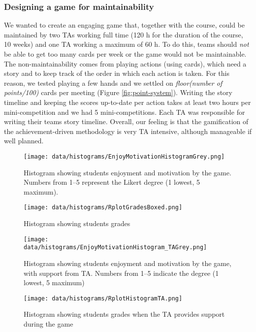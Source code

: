 \documentclass[sigconf]{acmart}
\begin{document}
\hypertarget{designing-a-game-for-maintainability}{%
\subsubsection*{Designing a game for
maintainability}\label{designing-a-game-for-maintainability}}

We wanted to create an engaging game that, together with the course,
could be maintained by two TAs working full time (120 h for the duration
of the course, 10 weeks) and one TA working a maximum of 60 h. To do
this, teams should \emph{not} be able to get too many cards per week or
the game would not be maintainable. The non-maintainability comes from
playing actions (using cards), which need a story and to keep track of
the order in which each action is taken. For this reason, we tested
playing a few hands and we settled on
\textit{floor(number of points/100)} cards per meeting (Figure
\ref{fig:point-system}). Writing the story timeline and keeping the
scores up-to-date per action takes at least two hours per
mini-competition and we had 5 mini-competitions. Each TA was responsible
for writing their teams story timeline. Overall, our feeling is that the
gamification of the achievement-driven methodology is very TA intensive,
although manageable if well planned.

\begin{figure}[t]
\texttt{[image: data/histograms/EnjoyMotivationHistogramGrey.png]}
\caption{\label{fig:histogram-enjoy-motiv}Histogram showing students enjoyment and motivation by the game.
Numbers from 1--5 represent the Likert degree (1 lowest, 5 maximum).}
\end{figure}

\begin{figure}[t]
\texttt{[image: data/histograms/RplotGradesBoxed.png]}
\caption{\label{fig:game-grades}Histogram showing students grades}
\end{figure}

\begin{figure}[t]
\texttt{[image: data/histograms/EnjoyMotivationHistogram\_TAGrey.png]}
\caption{\label{fig:game-enjoy-support-ta}Histogram showing students enjoyment and motivation by the game,
with support from TA.
Numbers from 1--5 indicate the degree (1 lowest, 5 maximum)}
\end{figure}

\begin{figure}[t]
\texttt{[image: data/histograms/RplotHistogramTA.png]}
\caption{\label{fig:game-grades-support-ta}Histogram showing students grades
when the TA provides support during the game}
\end{figure}
\end{document}

